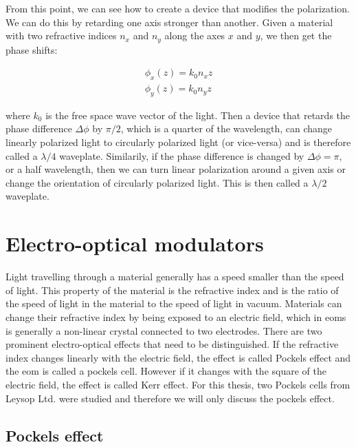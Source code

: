 From this point, we can see how to create a device that modifies the polarization. We can do this by retarding one axis stronger than another. Given a material with two refractive indices $n_x$ and $n_y$ along the axes $x$ and $y$, we then get the phase shifts:

\begin{align}
	\phi_x(z) = k_0 n_x z \\
	\phi_y(z) = k_0 n_y z
\end{align}
\label{eq:pol,phases}

where $k_0$ is the free space wave vector of the light. Then a device that retards the phase difference $\Delta \phi$ by $\pi/2$, which is a quarter of the wavelength, can change linearly polarized light to circularly polarized light (or vice-versa) and is therefore called a $\lambda / 4$ waveplate. Similarily, if the phase difference is changed by $\Delta \phi = \pi$, or a half wavelength, then we can turn linear polarization around a given axis or change the orientation of circularly polarized light. This is then called a $\lambda / 2$ waveplate.

\section{Electro-optical modulators}
\label{sec:eom}


Light travelling through a material generally has a speed smaller than the speed of light. This property of the material is the refractive index and is the ratio of the speed of light in the material to the speed of light in vacuum. Materials can change their refractive index by being exposed to an electric field, which in \acp{eom} is generally a non-linear crystal connected to two electrodes. There are two prominent electro-optical effects that need to be distinguished. If the refractive index changes linearly with the electric field, the effect is called Pockels effect and the \ac{eom} is called a pockels cell. However if it changes with the square of the electric field, the effect is called Kerr effect. For this thesis, two Pockels cells from Leysop Ltd. were studied and therefore we will only discuss the pockels effect.


\subsection{Pockels effect}

